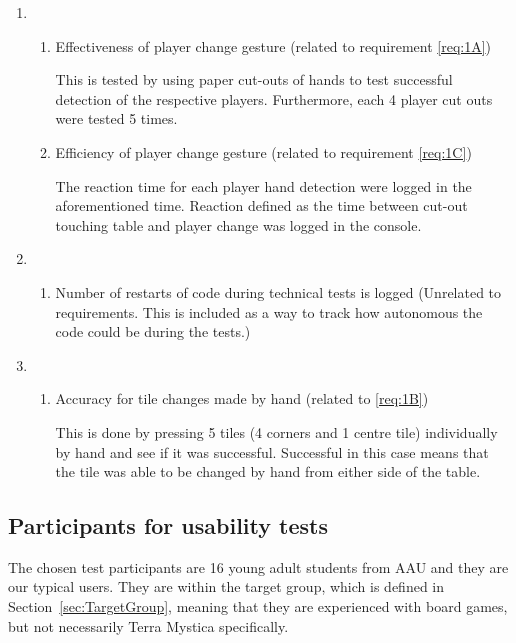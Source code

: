 \begin{enumerate}
	
\item \begin{enumerate}
\item Effectiveness of player change gesture (related to requirement \ref{req:1A})

This is tested by using paper cut-outs of hands to test successful detection of the respective players. Furthermore, each 4 player cut outs were tested 5 times.

\item Efficiency of player change gesture (related to requirement \ref{req:1C})

The reaction time for each player hand detection were logged in the aforementioned time. Reaction defined as the time between cut-out touching table and player change was logged in the console.
\end{enumerate}
	\item \begin{enumerate}
		\item Number of restarts of code during technical tests is logged (Unrelated to requirements. This is included as a way to track how autonomous the code could be during the tests.)
	\end{enumerate}
	\item \begin{enumerate}
		\item Accuracy for tile changes made by hand (related to \ref{req:1B})
		
		This is done by pressing 5 tiles (4 corners and 1 centre tile) individually by hand and see if it was successful. Successful in this case means that the tile was able to be changed by hand from either side of the table. 
	\end{enumerate}
\end{enumerate}

\subsection{Participants for usability tests}
The chosen test participants are 16 young adult students from AAU and they are our typical users. They are within the target group, which is defined in Section~\ref{sec:TargetGroup}, meaning that they are experienced with board games, but not necessarily Terra Mystica specifically. 

